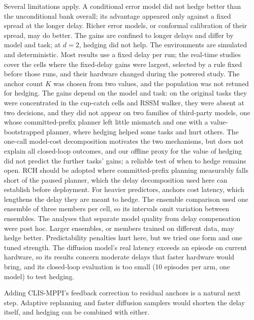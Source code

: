 \documentclass[aps,physrev,\manuscriptlayout,superscriptaddress,
  longbibliography,amsmath,amssymb]{revtex4-2}
\begin{document}
Several limitations apply. A conditional error model did not hedge better than the unconditional bank overall; its advantage appeared only against a fixed spread at the longer delay. Richer error models, or conformal calibration of their spread, may do better. The gains are confined to longer delays and differ by model and task; at $d=2$, hedging did not help. The environments are simulated and deterministic. Most results use a fixed delay per run; the real-time studies cover the cells where the fixed-delay gains were largest, selected by a rule fixed before those runs, and their hardware changed during the powered study. The anchor count $K$ was chosen from two values, and the population was not retuned for hedging. The gains depend on the model and task: on the original tasks they were concentrated in the cup-catch cells and RSSM walker, they were absent at two decisions, and they did not appear on two families of third-party models, one whose committed-prefix planner left little mismatch and one with a value-bootstrapped planner, where hedging helped some tasks and hurt others. The one-call model-cost decomposition motivates the two mechanisms, but does not explain all closed-loop outcomes, and our offline proxy for the value of hedging did not predict the further tasks' gains; a reliable test of when to hedge remains open. RCH should be adopted where committed-prefix planning measurably falls short of the paused planner, which the delay decomposition used here can establish before deployment. For heavier predictors, anchors cost latency, which lengthens the delay they are meant to hedge. The ensemble comparison used one ensemble of three members per cell, so its intervals omit variation between ensembles. The analyses that separate model quality from delay compensation were post hoc. Larger ensembles, or members trained on different data, may hedge better. Predictability penalties hurt here, but we tried one form and one tuned strength. The diffusion model's real latency exceeds an episode on current hardware, so its results concern moderate delays that faster hardware would bring, and its closed-loop evaluation is too small (10 episodes per arm, one model) to test hedging.

Adding CLIS-MPPI's feedback correction\cite{liu2026clis} to residual anchors is a natural next step. Adaptive replanning\cite{cheng2026adarep} and faster diffusion samplers\cite{song2021ddim,chen2024diffusionforcing} would shorten the delay itself, and hedging can be combined with either.

\end{document}
